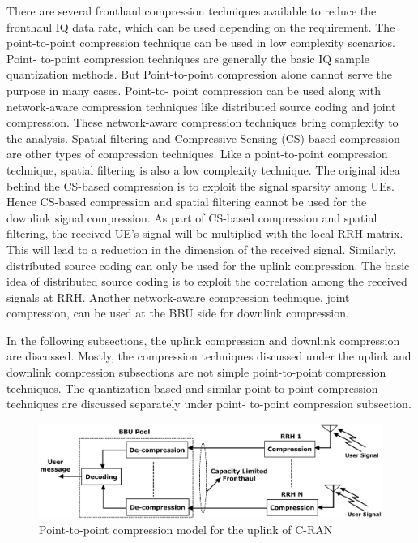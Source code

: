 \begin{multicols}{2}
There are several fronthaul compression techniques available to reduce the fronthaul IQ data rate, which can be used depending on the requirement. The point-to-point compression technique can be used in low complexity scenarios. Point- to-point compression techniques are generally the basic IQ sample quantization methods. But Point-to-point compression alone cannot serve the purpose in many cases. Point-to- point compression can be used along with network-aware compression techniques like distributed source coding and joint compression. These network-aware compression techniques bring complexity to the analysis. Spatial filtering and Compressive Sensing (CS) based compression are other types of compression techniques. Like a point-to-point compression technique, spatial filtering is also a low complexity technique. The original idea behind the CS-based compression is to exploit the signal sparsity among UEs. Hence CS-based compression and spatial filtering cannot be used for the downlink signal compression. As part of CS-based compression and spatial filtering, the received UE’s signal will be multiplied with the local RRH matrix. This will lead to a reduction in the dimension of the received signal. Similarly, distributed source coding can only be used for the uplink compression. The basic idea of distributed source coding is to exploit the correlation among the received signals at RRH. Another network-aware compression technique, joint compression, can be used at the BBU side for downlink compression.

In the following subsections, the uplink compression and downlink compression are discussed. Mostly, the compression techniques discussed under the uplink and downlink compression subsections are not simple point-to-point compression techniques. The quantization-based and similar point-to-point compression techniques are discussed separately under point- to-point compression subsection.
\end{multicols}

\begin{figure}[H]
\centering
\includegraphics[scale=.58]{src/Figures/chap3/fig04.jpg}
\caption{Point-to-point compression model for the uplink of C-RAN}\label{fig04}
\end{figure}

